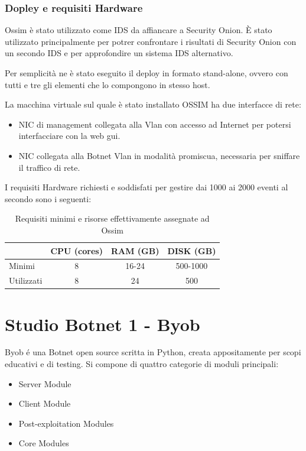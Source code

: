 \subsection*{Dopley e requisiti Hardware}

Ossim è stato utilizzato come IDS da affiancare a Security Onion. È stato utilizzato principalmente per potrer confrontare i risultati di Security Onion con un secondo IDS e per approfondire un sistema  IDS alternativo.

Per semplicità ne è stato eseguito il deploy in formato stand-alone, ovvero con tutti e tre gli elementi che lo compongono in stesso host.

La macchina virtuale sul quale è stato installato OSSIM ha due interfacce di rete: \begin{itemize}
    \item  NIC di management collegata alla Vlan con accesso ad Internet per potersi interfacciare con la web gui.
    \item  NIC collegata alla Botnet Vlan in modalità promiscua, necessaria per sniffare il traffico di rete.
\end{itemize} 

I requisiti Hardware richiesti  e soddisfati per gestire dai 1000 ai 2000  eventi al secondo sono i seguenti:
\begin{table}[hbtp]
    \centering
    \begin{tabular}{|l|c|c|c|}
        \hline
        & CPU (cores) & RAM (GB) & DISK (GB) \\
        \hline
        Minimi     & 8 & 16-24 & 500-1000   \\
        \hline
        Utilizzati &  8  & 24 & 500 \\
        \hline
    \end{tabular}
    \caption{Requisiti minimi e risorse effettivamente assegnate ad Ossim}
    \label{tab:requisitiHw4}
\end{table}

\chapter{Studio Botnet 1 - Byob}
    

Byob \cite{byob} é una Botnet open source scritta in Python, creata appositamente per scopi educativi e di testing.
Si compone di quattro categorie di moduli principali:
\begin{itemize}
    \item Server Module
    \item Client Module
    \item Post-exploitation Modules
    \item Core Modules
\end{itemize}

